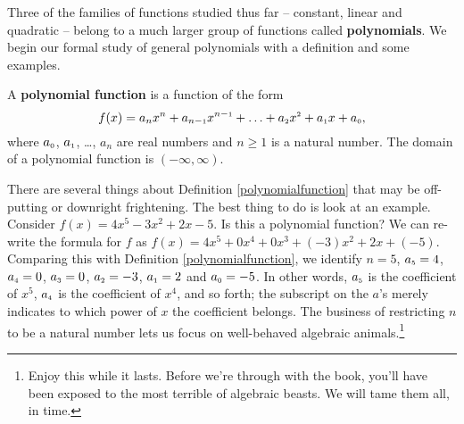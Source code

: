 

\setcounter{footnote}{0}

\label{GraphsofPolynomials}

Three of the families of functions studied thus far -- constant, linear and  quadratic -- belong to a much larger group of functions called \textbf{polynomials}.  We begin our formal study of general polynomials with a definition and some examples.

\smallskip

\colorbox{ResultColor}{\bbm

\begin{defn} \label{polynomialfunction} A \textbf{polynomial function} is a function of the form \[ f(x) = a_{n} x^{n} + a_{n-\mbox{\tiny$1$}} x^{n-\mbox{\tiny$1$}} + \ldots + a_{\mbox{\tiny $2$}} x^{\mbox{\tiny $2$}} + a_{\mbox{\tiny $1$}} x + a_{\mbox{\tiny $0$}},\] where $a_{\mbox{\tiny $0$}}$, $a_{\mbox{\tiny $1$}}$, \ldots, $a_{n}$ are real numbers and $n \geq 1$ is a natural number.  The domain of a polynomial function is $(-\infty, \infty)$.

\end{defn}

\ebm}

\medskip

There are several things about Definition \ref{polynomialfunction} that may be off-putting or downright frightening.  The best thing to do is look at an example.  Consider $f(x) = 4x^5 - 3x^2 + 2x - 5$.  Is this a polynomial function?  We can re-write the formula for $f$ as $f(x)= 4x^5 + 0 x^{4} + 0 x^{3} + (-3)x^2 + 2 x + (-5).$  Comparing this with Definition \ref{polynomialfunction}, we identify $n=5$, $a_{\mbox{\tiny $5$}} = 4$, $a_{\mbox{\tiny $4$}} = 0$, $a_{\mbox{\tiny $3$}} = 0$, $a_{\mbox{\tiny $2$}} = -3$, $a_{\mbox{\tiny $1$}} = 2$ and $a_{\mbox{\tiny $0$}} = -5$.  In other words, $a_{\mbox{\tiny $5$}}$ is the coefficient of $x^{5}$, $a_{\mbox{\tiny $4$}}$ is the coefficient of $x^{4}$, and so forth;  the subscript on the $a$'s merely indicates to which power of $x$ the coefficient belongs.  The business of restricting $n$ to be a natural number lets us focus on well-behaved algebraic animals.\footnote{Enjoy this while it lasts. Before we're through with the book, you'll have been exposed to the most terrible of algebraic beasts.  We will tame them all, in time.}  

